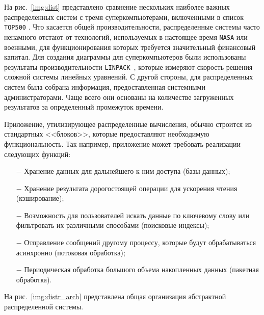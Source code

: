 На рис.~\ref{img:dist} представлено сравнение нескольких наиболее важных распределенных систем с тремя суперкомпьютерами, включенными в список \texttt{TOP500} \cite{top500}. 
Что касается общей производительности, распределенные системы часто ненамного отстают от технологий, используемых в настоящее время \texttt{NASA} или военными, для функционирования которых требуется значительный финансовый капитал. 
Для создания диаграммы для суперкомпьютеров были использованы результаты производительности \texttt{LINPACK}~\cite{linpack}, которые измеряют скорость решения сложной системы линейных уравнений. 
С другой стороны, для распределенных систем была собрана информация, предоставленная системными администраторами.
Чаще всего они основаны на количестве загруженных результатов за определенный промежуток времени.


Приложение, утилизирующее распределенные вычисления, обычно строится из стандартных <<блоков>>, которые предоставляют необходимую функциональность.
Так например, приложение может требовать реализации следующих функций:
\begin{itemize}
  \item[$-$] Хранение данных для дальнейшего к ним доступа (базы данных);
  \item[$-$] Хранение результата дорогостоящей операции для ускорения чтения (кэширование);
  \item[$-$] Возможность для пользователей искать данные по ключевому слову или фильтровать их различными способами (поисковые индексы);
  \item[$-$] Отправление сообщений другому процессу, которые будут обрабатываться асинхронно (потоковая обработка);
  \item[$-$] Периодическая обработка большого объема накопленных данных (пакетная обработка).
\end{itemize}

На рис.~\ref{img:distr_arch} представлена общая организация абстрактной распределенной системы.


